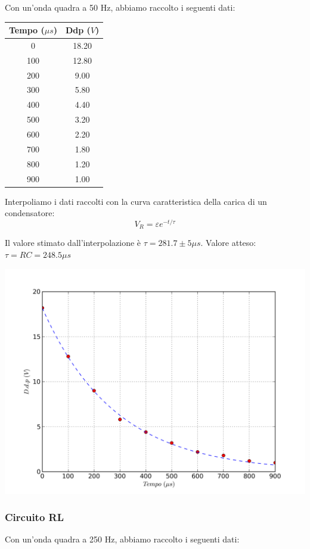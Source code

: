 Con un'onda quadra a 50 Hz, abbiamo raccolto i seguenti dati:
\begin{center}
\begin{tabular}{*{2}{c}}
Tempo ($\mu s$) & Ddp ($V$) \\
\midrule
0 & 18.20 \\
100 & 12.80 \\
200 & 9.00 \\
300 & 5.80 \\
400 & 4.40 \\
500 & 3.20 \\
600 & 2.20 \\
700 & 1.80 \\
800 & 1.20 \\
900 & 1.00 \\
\end{tabular}
\end{center}

Interpoliamo i dati raccolti con la curva caratteristica della carica di un condensatore: 
$$V_R = \varepsilon e^{-t/\tau}$$

Il valore stimato dall'interpolazione è $\tau=281.7 \pm 5 \mu s$.
Valore atteso: $\tau=RC=248.5 \mu s$


\begin{center}
 \includegraphics[scale=0.70]{grafici/C3/fitcond.png}
\end{center}






\subsubsection{Circuito RL}
Con un'onda quadra a 250 Hz, abbiamo raccolto i seguenti dati:

